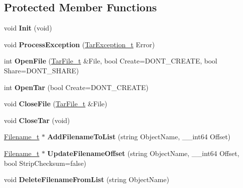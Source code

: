 \subsection*{Protected Member Functions}
\begin{DoxyCompactItemize}
\item 
\hypertarget{class_c_tar_a5f4c1748962f3d75ba6eb799e9dcc0af}{
void {\bfseries Init} (void)}
\label{class_c_tar_a5f4c1748962f3d75ba6eb799e9dcc0af}

\item 
\hypertarget{class_c_tar_a1971a08f2da36cde1ed250304eb15898}{
void {\bfseries ProcessException} (\hyperlink{struct_tar_exception}{TarException\_\-t} Error)}
\label{class_c_tar_a1971a08f2da36cde1ed250304eb15898}

\item 
\hypertarget{class_c_tar_a1ab5349ef99326bb21c599d6423f36e1}{
int {\bfseries OpenFile} (\hyperlink{struct_tar_file}{TarFile\_\-t} \&File, bool Create=DONT\_\-CREATE, bool Share=DONT\_\-SHARE)}
\label{class_c_tar_a1ab5349ef99326bb21c599d6423f36e1}

\item 
\hypertarget{class_c_tar_a6b256f74265b145e2f18d006d2fb5dd6}{
int {\bfseries OpenTar} (bool Create=DONT\_\-CREATE)}
\label{class_c_tar_a6b256f74265b145e2f18d006d2fb5dd6}

\item 
\hypertarget{class_c_tar_a3f0fae27806137f2270c10c932c9ad93}{
void {\bfseries CloseFile} (\hyperlink{struct_tar_file}{TarFile\_\-t} \&File)}
\label{class_c_tar_a3f0fae27806137f2270c10c932c9ad93}

\item 
\hypertarget{class_c_tar_a773ad2528ad70d962e89ef7bcc1a512e}{
void {\bfseries CloseTar} (void)}
\label{class_c_tar_a773ad2528ad70d962e89ef7bcc1a512e}

\item 
\hypertarget{class_c_tar_afef7227673ca9b33d68ee300dc9f3a47}{
\hyperlink{struct_filename}{Filename\_\-t} $\ast$ {\bfseries AddFilenameToList} (string ObjectName, \_\-\_\-int64 Offset)}
\label{class_c_tar_afef7227673ca9b33d68ee300dc9f3a47}

\item 
\hypertarget{class_c_tar_a1082fd5413ffd4e92ffa48d9604a141b}{
\hyperlink{struct_filename}{Filename\_\-t} $\ast$ {\bfseries UpdateFilenameOffset} (string ObjectName, \_\-\_\-int64 Offset, bool StripChecksum=false)}
\label{class_c_tar_a1082fd5413ffd4e92ffa48d9604a141b}

\item 
\hypertarget{class_c_tar_a0fd9381e3416a6d44f37792280da3ed7}{
void {\bfseries DeleteFilenameFromList} (string ObjectName)}
\label{class_c_tar_a0fd9381e3416a6d44f37792280da3ed7}


\end{DoxyCompactItemize}
